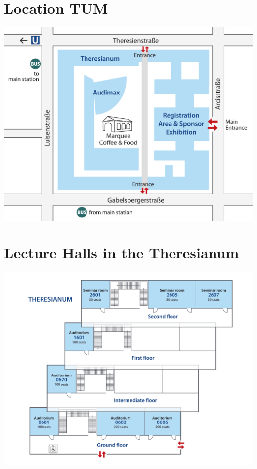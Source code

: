 \newpage
\section*{Location TUM}

\vspace{2cm}
\includegraphics[width=\linewidth]{images/Gelaendeplan_TUM_V2.pdf}

\newpage
\section*{Lecture Halls in the Theresianum}

\vspace{2cm}
    \includegraphics[width=\linewidth, trim=15mm 0mm 15mm 0mm, clip] {images/Raumplan_Theresianum_V2.pdf}

